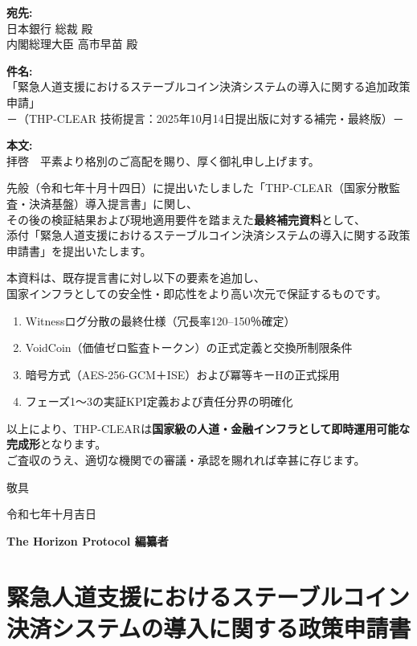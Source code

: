 \documentclass[
  a4paper,
  ja=standard,
  xelatex]{bxjsarticle}
\author{}
\date{}
\begin{document}
\textbf{宛先:}\\
日本銀行 総裁 殿\\
内閣総理大臣 高市早苗 殿

\textbf{件名:}\\
「緊急人道支援におけるステーブルコイン決済システムの導入に関する追加政策申請」\\
－（THP-CLEAR 技術提言：2025年10月14日提出版に対する補完・最終版）－

\textbf{本文:}\\
拝啓　平素より格別のご高配を賜り、厚く御礼申し上げます。

先般（令和七年十月十四日）に提出いたしました「THP-CLEAR（国家分散監査・決済基盤）導入提言書」に関し、\\
その後の検証結果および現地適用要件を踏まえた\textbf{最終補完資料}として、\\
添付「緊急人道支援におけるステーブルコイン決済システムの導入に関する政策申請書」を提出いたします。

本資料は、既存提言書に対し以下の要素を追加し、\\
国家インフラとしての安全性・即応性をより高い次元で保証するものです。

\begin{enumerate}
\def\labelenumi{\arabic{enumi}.}
\item
  Witnessログ分散の最終仕様（冗長率120--150％確定）
\item
  VoidCoin（価値ゼロ監査トークン）の正式定義と交換所制限条件
\item
  暗号方式（AES-256-GCM＋ISE）および冪等キーHの正式採用
\item
  フェーズ1～3の実証KPI定義および責任分界の明確化
\end{enumerate}

以上により、THP-CLEARは\textbf{国家級の人道・金融インフラとして即時運用可能な完成形}となります。\\
ご査収のうえ、適切な機関での審議・承認を賜れれば幸甚に存じます。

敬具

令和七年十月吉日

\textbf{The Horizon Protocol 編纂者}

\section{\texorpdfstring{\textbf{緊急人道支援におけるステーブルコイン決済システムの導入に関する政策申請書}}{緊急人道支援におけるステーブルコイン決済システムの導入に関する政策申請書}}\label{ux7dcaux6025ux4ebaux9053ux652fux63f4ux306bux304aux3051ux308bux30b9ux30c6ux30fcux30d6ux30ebux30b3ux30a4ux30f3ux6c7aux6e08ux30b7ux30b9ux30c6ux30e0ux306eux5c0eux5165ux306bux95a2ux3059ux308bux653fux7b56ux7533ux8acbux66f8}
\end{document}
